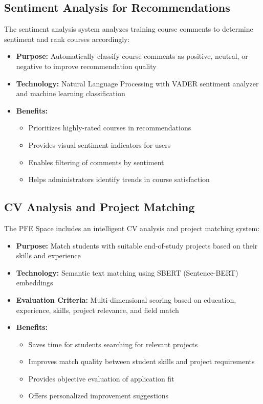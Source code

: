 \documentclass[12pt,a4paper]{report}
\begin{document}
\subsection{Sentiment Analysis for Recommendations}

The sentiment analysis system analyzes training course comments to determine sentiment and rank courses accordingly:

\begin{itemize}
    \item \textbf{Purpose:} Automatically classify course comments as positive, neutral, or negative to improve recommendation quality

    \item \textbf{Technology:} Natural Language Processing with VADER sentiment analyzer and machine learning classification

    \item \textbf{Benefits:}
    \begin{itemize}
        \item Prioritizes highly-rated courses in recommendations
        \item Provides visual sentiment indicators for users
        \item Enables filtering of comments by sentiment
        \item Helps administrators identify trends in course satisfaction
    \end{itemize}
\end{itemize}

\subsection{CV Analysis and Project Matching}

The PFE Space includes an intelligent CV analysis and project matching system:

\begin{itemize}
    \item \textbf{Purpose:} Match students with suitable end-of-study projects based on their skills and experience

    \item \textbf{Technology:} Semantic text matching using SBERT (Sentence-BERT) embeddings

    \item \textbf{Evaluation Criteria:} Multi-dimensional scoring based on education, experience, skills, project relevance, and field match

    \item \textbf{Benefits:}
    \begin{itemize}
        \item Saves time for students searching for relevant projects
        \item Improves match quality between student skills and project requirements
        \item Provides objective evaluation of application fit
        \item Offers personalized improvement suggestions
    \end{itemize}
\end{itemize}
\end{document}
